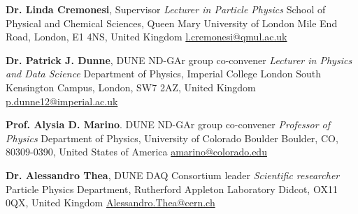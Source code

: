 \begin{list}{\scalebox{0.7}{$\square$}}{\leftmargin=1em \itemindent=0em}
	\item \textbf{Dr. Linda Cremonesi}, Supervisor \newline \textit{Lecturer in Particle Physics} \newline School of Physical and Chemical Sciences, Queen Mary University of London  Mile End Road, London, E1 4NS, United Kingdom \newline \href{mailto:l.cremonesi@qmul.ac.uk}{l.cremonesi@qmul.ac.uk} 
	\item \textbf{Dr. Patrick J. Dunne}, DUNE ND-GAr group co-convener \newline \textit{Lecturer in Physics and Data Science} \newline Department of Physics, Imperial College London \newline South Kensington Campus, London, SW7 2AZ, United Kingdom \newline \href{mailto:p.dunne12@imperial.ac.uk}{p.dunne12@imperial.ac.uk} 
	\item \textbf{Prof. Alysia D. Marino}. DUNE ND-GAr group co-convener \newline \textit{Professor of Physics} \newline Department of Physics, University of Colorado Boulder \newline Boulder, CO, 80309-0390, United States of America \newline \href{mailto:amarino@colorado.edu}{amarino@colorado.edu}
	\item \textbf{Dr. Alessandro Thea}, DUNE DAQ Consortium leader \newline \textit{Scientific researcher} \newline  Particle Physics Department, Rutherford Appleton Laboratory \newline Didcot, OX11 0QX, United Kingdom \newline \href{mailto:Alessandro.Thea@cern.ch}{Alessandro.Thea@cern.ch} 
\end{list}